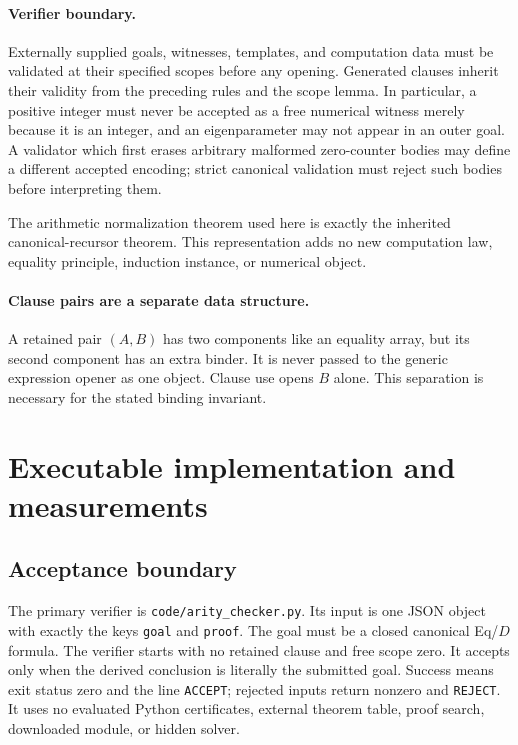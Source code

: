 \documentclass[11pt,letterpaper]{article}
\theoremstyle{definition}\newtheorem{definition}[theorem]{Definition}
\newcommand{\file}[1]{\texttt{\small\nolinkurl{#1}}}
\begin{document}
\paragraph{Verifier boundary.}
Externally supplied goals, witnesses, templates, and computation data
must be validated at their specified scopes before any opening. Generated
clauses inherit their validity from the preceding rules and the scope
lemma. In particular, a positive integer must never be accepted as a
free numerical witness merely because it is an integer, and an
eigenparameter may not appear in an outer goal. A validator which first
erases arbitrary malformed zero-counter bodies may define a different
accepted encoding; strict canonical validation must reject such bodies
before interpreting them.

The arithmetic normalization theorem used here is exactly the inherited
canonical-recursor theorem. This representation adds no new computation
law, equality principle, induction instance, or numerical object.

\paragraph{Clause pairs are a separate data structure.}
A retained pair $(A,B)$ has two components like an equality array, but its
second component has an extra binder. It is never passed to the generic
expression opener as one object. Clause use opens $B$ alone. This
separation is necessary for the stated binding invariant.

\section{Executable implementation and measurements}
\label{sec:implementation}

\subsection{Acceptance boundary}
The primary verifier is \file{code/arity_checker.py}. Its input is one JSON object with exactly the keys \file{goal} and \file{proof}. The goal must be a closed canonical Eq/$D$ formula. The verifier starts with no retained clause and free scope zero. It accepts only when the derived conclusion is literally the submitted goal. Success means exit status zero and the line \file{ACCEPT}; rejected inputs return nonzero and \file{REJECT}. It uses no evaluated Python certificates, external theorem table, proof search, downloaded module, or hidden solver.
\end{document}
